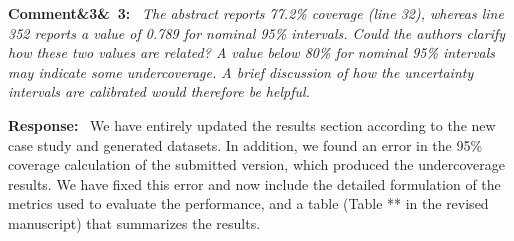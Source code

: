 \documentclass[11pt]{article}
\newenvironment{rcomment}[1]{\par\bigskip\noindent\textbf{Comment\ifx&#1&\else\ #1\fi:}\ \itshape}{\par}
\newenvironment{response}{\par\smallskip\noindent\color{resp}\textbf{Response:}\ }{\par}
\begin{document}
\begin{rcomment}{3}
The abstract reports 77.2\% coverage (line 32), whereas line 352 reports a value of 0.789 for nominal 95\% intervals.
Could the authors clarify how these two values are related? A value below 80\% for nominal 95\% intervals may indicate
some undercoverage. A brief discussion of how the uncertainty intervals are calibrated would therefore be helpful.
\end{rcomment}
\begin{response}
	We have entirely updated the results section according to the new case study and generated datasets.
	In addition, we found an error in the 95\% coverage calculation of the submitted version, which produced the undercoverage results.
	We have fixed this error and now include the detailed formulation of the metrics used to evaluate the performance, and a table (Table ** in the revised manuscript) that summarizes the results. 
	

\end{response}
\end{document}
